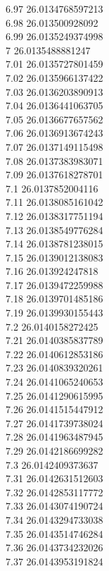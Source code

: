 {6.97	26.0134768597213\\
6.98	26.013500928092\\
6.99	26.0135249374998\\
7	26.0135488881247\\
7.01	26.0135727801459\\
7.02	26.0135966137422\\
7.03	26.0136203890913\\
7.04	26.0136441063705\\
7.05	26.0136677657562\\
7.06	26.0136913674243\\
7.07	26.0137149115498\\
7.08	26.0137383983071\\
7.09	26.0137618278701\\
7.1	26.0137852004116\\
7.11	26.0138085161042\\
7.12	26.0138317751194\\
7.13	26.0138549776284\\
7.14	26.0138781238015\\
7.15	26.0139012138083\\
7.16	26.013924247818\\
7.17	26.0139472259988\\
7.18	26.0139701485186\\
7.19	26.0139930155443\\
7.2	26.0140158272425\\
7.21	26.0140385837789\\
7.22	26.0140612853186\\
7.23	26.0140839320261\\
7.24	26.0141065240653\\
7.25	26.0141290615995\\
7.26	26.0141515447912\\
7.27	26.0141739738024\\
7.28	26.0141963487945\\
7.29	26.0142186699282\\
7.3	26.0142409373637\\
7.31	26.0142631512603\\
7.32	26.0142853117772\\
7.33	26.0143074190724\\
7.34	26.0143294733038\\
7.35	26.0143514746284\\
7.36	26.0143734232026\\
7.37	26.0143953191824\\
}
